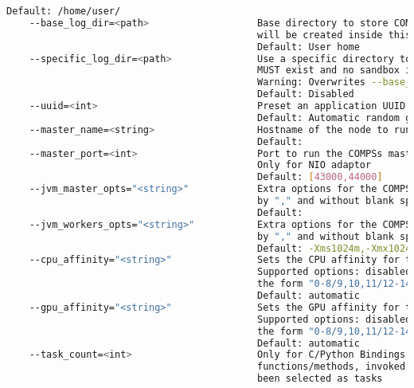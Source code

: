 \begin{lstlisting}[language=bash]
                                            Default: /home/user/
    --base_log_dir=<path>                   Base directory to store COMPSs log files (a .COMPSs/ folder
                                            will be created inside this location)
                                            Default: User home
    --specific_log_dir=<path>               Use a specific directory to store COMPSs log files (the folder
                                            MUST exist and no sandbox is created)
                                            Warning: Overwrites --base_log_dir option
                                            Default: Disabled
    --uuid=<int>                            Preset an application UUID
                                            Default: Automatic random generation
    --master_name=<string>                  Hostname of the node to run the COMPSs master
                                            Default: 
    --master_port=<int>                     Port to run the COMPSs master communications.
                                            Only for NIO adaptor
                                            Default: [43000,44000]
    --jvm_master_opts="<string>"            Extra options for the COMPSs Master JVM. Each option separed
                                            by "," and without blank spaces (Notice the quotes)
                                            Default: 
    --jvm_workers_opts="<string>"           Extra options for the COMPSs Workers JVMs. Each option separed
                                            by "," and without blank spaces (Notice the quotes)
                                            Default: -Xms1024m,-Xmx1024m,-Xmn400m
    --cpu_affinity="<string>"               Sets the CPU affinity for the workers
                                            Supported options: disabled, automatic, user defined map of
                                            the form "0-8/9,10,11/12-14,15,16"
                                            Default: automatic
    --gpu_affinity="<string>"               Sets the GPU affinity for the workers
                                            Supported options: disabled, automatic, user defined map of
                                            the form "0-8/9,10,11/12-14,15,16"
                                            Default: automatic
    --task_count=<int>                      Only for C/Python Bindings. Maximum number of different
                                            functions/methods, invoked from the application, that have
                                            been selected as tasks

\end{lstlisting}
